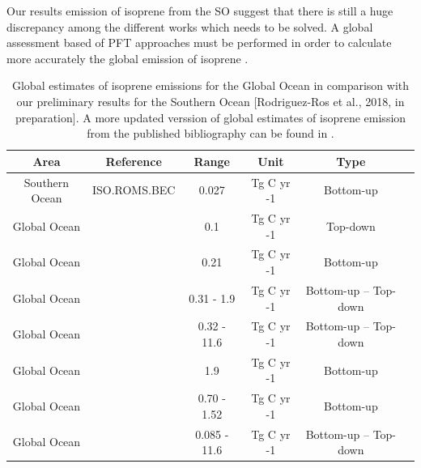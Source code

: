 \documentclass[draft,linenumbers]{agujournal}
\begin{document}
Our results emission of isoprene from the SO suggest that there is still a huge discrepancy among the different works which needs to be solved. A global assessment based of PFT approaches must be performed in order to calculate more accurately the global emission 
of isoprene \citep{hackenberg2017potential}.

\begin{center}

\begin{table}[h!]

\centering

\caption{Global estimates of isoprene emissions for the Global Ocean in comparison with our preliminary results for the Southern Ocean [Rodriguez-Ros et al., 2018, in preparation]. A more updated verssion of global estimates of isoprene emission from the published bibliography can be found in \citep{bruggemann2018interfacial}.}
\bigskip

\label{tab:global}

\begin{tabular}[ht]{ c|c|c|c|c|c } 

 \textbf{Area} & \textbf{Reference} & \textbf{Range} & \textbf{Unit} & \textbf{Type} \\\hline

Southern Ocean & ISO.ROMS.BEC &  0.027  & 	Tg C yr -1 & Bottom-up  \\

Global Ocean & \citep{palmer2005quantifying}   & 0.1   &  Tg C yr -1 & Top-down \\

Global Ocean  & \citep{booge2016can}  & 0.21 & Tg C yr -1 &  Bottom-up\\

Global Ocean  & \citep{Arnold2009} & 0.31 - 1.9 & Tg C yr -1 & Bottom-up -- Top-down \\

Global Ocean  & \citep{luo2010numerical} & 0.32 - 11.6  & Tg C yr -1 &  Bottom-up -- Top-down \\
Global Ocean  & \citep{gantt2009new} & 1.9 & Tg C yr -1   & Bottom-up\\
Global Ocean  & \citep{bruggemann2018interfacial} & 0.70 - 1.52 & Tg C yr -1 & Bottom-up  \\
Global Ocean  & \citep{shaw2010production} & 0.085 - 11.6 & Tg C yr -1 & Bottom-up -- Top-down \\
\end{tabular}

\end{table}

\end{center}
\end{document}

